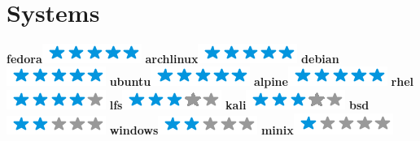 \documentclass[]{friggeri-cv}
\begin{document}
\begin{aside}
~
~
~
    \section{Systems}
        \textbf{fedora}\includegraphics[scale=0.40]{img/5stars.png}
        \textbf{archlinux}\includegraphics[scale=0.40]{img/5stars.png}
        \textbf{debian}\includegraphics[scale=0.40]{img/5stars.png}
        \textbf{ubuntu}\includegraphics[scale=0.40]{img/5stars.png}
        \textbf{alpine}\includegraphics[scale=0.40]{img/5stars.png}
        \textbf{rhel}\includegraphics[scale=0.40]{img/4stars.png}
        \textbf{lfs}\includegraphics[scale=0.40]{img/3stars.png}
        \textbf{kali}\includegraphics[scale=0.40]{img/3stars.png}
        \textbf{bsd}\includegraphics[scale=0.40]{img/2stars.png}
        \textbf{windows}\includegraphics[scale=0.40]{img/2stars.png}
        \textbf{minix}\includegraphics[scale=0.40]{img/1stars.png}
        ~

\end{aside}
\end{document}
